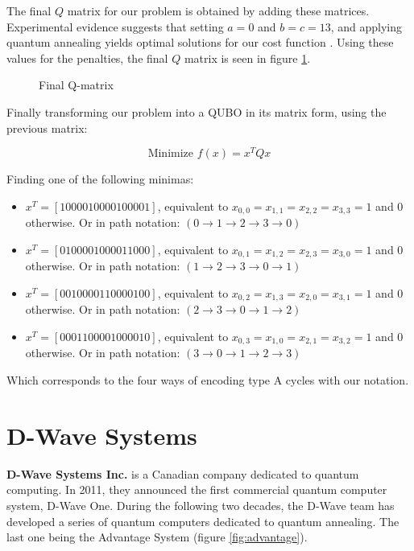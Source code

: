 The final $Q$ matrix for our problem is obtained by adding these matrices. Experimental evidence suggests that setting $a = 0$ and $b = c = 13$, and applying quantum annealing yields optimal solutions for our cost function \cite{Sarkar2020}. Using these values for the penalties, the final $Q$ matrix is seen in figure \ref{fig:salesman-Q-matrix}.

\begin{figure}[H]
	\centering
	\caption{Final Q-matrix \cite{Sarkar2020}}
	\label{fig:salesman-Q-matrix}
\end{figure}

Finally transforming our problem into a QUBO in its matrix form, using the previous matrix:

$$ \text{Minimize } f(x) = x^T Q x $$

Finding one of the following minimas:

\begin{itemize}
	\item $x^T = [1000010000100001]$, equivalent to $x_{0,0} = x_{1,1} = x_{2,2} = x_{3,3} = 1$ and $0$ otherwise. Or in path notation: $(0 \rightarrow 1 \rightarrow 2 \rightarrow 3 \rightarrow 0)$
	\item $x^T = [0100001000011000]$, equivalent to $x_{0,1} = x_{1,2} = x_{2,3} = x_{3,0} = 1$ and $0$ otherwise. Or in path notation: $(1 \rightarrow 2 \rightarrow 3 \rightarrow 0 \rightarrow 1)$
	\item $x^T = [0010000110000100]$, equivalent to $x_{0,2} = x_{1,3} = x_{2,0} = x_{3,1} = 1$ and $0$ otherwise. Or in path notation: $(2 \rightarrow 3 \rightarrow 0 \rightarrow 1 \rightarrow 2)$
	\item $x^T = [0001100001000010]$, equivalent to $x_{0,3} = x_{1,0} = x_{2,1} = x_{3,2} = 1$ and $0$ otherwise. Or in path notation: $(3 \rightarrow 0 \rightarrow 1 \rightarrow 2 \rightarrow 3)$
\end{itemize}

Which corresponds to the four ways of encoding type A cycles with our notation.


\FloatBarrier
\section{D-Wave Systems}


\textbf{D-Wave Systems Inc.} is a Canadian company dedicated to quantum computing. In 2011, they announced the first commercial quantum computer system, D-Wave One. During the following two decades, the D-Wave team has developed a series of quantum computers dedicated to quantum annealing. The last one being the Advantage System (figure \ref{fig:advantage}).

